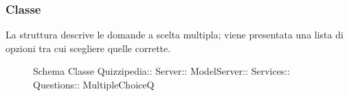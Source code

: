 \subsubsection{Classe }
La struttura descrive le domande a scelta multipla; viene presentata una lista di opzioni tra cui scegliere quelle corrette.
\begin{figure}[H]
\centering
\noindent{}
\caption[Schema Classe MultipleChoiceQ]{Schema Classe Quizzipedia:: Server:: ModelServer:: Services:: Questions:: MultipleChoiceQ}
\end{figure}
